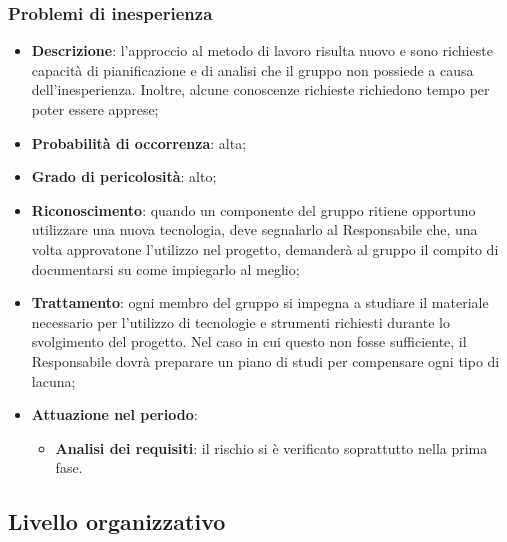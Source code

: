 		\subsubsection{Problemi di inesperienza}
		\begin{itemize}
			\item \textbf{Descrizione}: l'approccio al metodo di lavoro risulta nuovo e sono richieste capacità di pianificazione e di analisi che il gruppo non possiede a causa dell'inesperienza. Inoltre, alcune conoscenze richieste richiedono tempo per poter essere apprese;
			\item \textbf{Probabilità di occorrenza}: alta;
			\item \textbf{Grado di pericolosità}: alto;
			\item \textbf{Riconoscimento}: quando un componente del gruppo ritiene opportuno utilizzare una nuova tecnologia, deve segnalarlo al Responsabile che, una volta approvatone l'utilizzo nel progetto, demanderà al gruppo il compito di documentarsi su come 	impiegarlo al meglio;
			\item \textbf{Trattamento}: ogni membro del gruppo si impegna a studiare il materiale necessario per l'utilizzo di tecnologie e strumenti richiesti durante lo svolgimento del progetto. Nel caso in cui questo non fosse sufficiente, il Responsabile dovrà preparare un piano di studi per compensare ogni tipo di lacuna;
			\item \textbf{Attuazione nel periodo}:
			\begin{itemize}
				\item \textbf{Analisi dei requisiti}:  il rischio si è verificato soprattutto nella prima fase.
			\end{itemize}
		\end{itemize}
	\subsection{Livello organizzativo}
